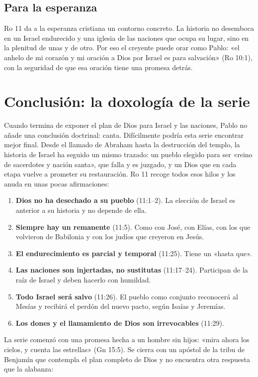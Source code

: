\documentclass[11pt,letterpaper]{article}
\begin{document}
\subsection{Para la esperanza}
Ro 11 da a la esperanza cristiana un contorno concreto. La historia no desemboca en un Israel endurecido y una iglesia de las naciones que ocupa su lugar, sino en la plenitud de unas y de otro. Por eso el creyente puede orar como Pablo: «el anhelo de mi corazón y mi oración a Dios por Israel es para salvación» (Ro 10:1), con la seguridad de que esa oración tiene una promesa detrás.

\section{Conclusión: la doxología de la serie}

Cuando termina de exponer el plan de Dios para Israel y las naciones, Pablo no añade una conclusión doctrinal: canta. Difícilmente podría esta serie encontrar mejor final. Desde el llamado de Abraham hasta la destrucción del templo, la historia de Israel ha seguido un mismo trazado: un pueblo elegido para ser «reino de sacerdotes y nación santa», que falla y es juzgado, y un Dios que en cada etapa vuelve a prometer su restauración. Ro 11 recoge todos esos hilos y los anuda en unas pocas afirmaciones:

\begin{enumerate}
\item \textbf{Dios no ha desechado a su pueblo} (11:1--2). La elección de Israel es anterior a su historia y no depende de ella.
\item \textbf{Siempre hay un remanente} (11:5). Como con José, con Elías, con los que volvieron de Babilonia y con los judíos que creyeron en Jesús.
\item \textbf{El endurecimiento es parcial y temporal} (11:25). Tiene un «hasta que».
\item \textbf{Las naciones son injertadas, no sustitutas} (11:17--24). Participan de la raíz de Israel y deben hacerlo con humildad.
\item \textbf{Todo Israel será salvo} (11:26). El pueblo como conjunto reconocerá al Mesías y recibirá el perdón del nuevo pacto, según Isaías y Jeremías.
\item \textbf{Los dones y el llamamiento de Dios son irrevocables} (11:29).
\end{enumerate}

La serie comenzó con una promesa hecha a un hombre sin hijos: «mira ahora los cielos, y cuenta las estrellas» (Gn 15:5). Se cierra con un apóstol de la tribu de Benjamín que contempla el plan completo de Dios y no encuentra otra respuesta que la alabanza:
\end{document}
